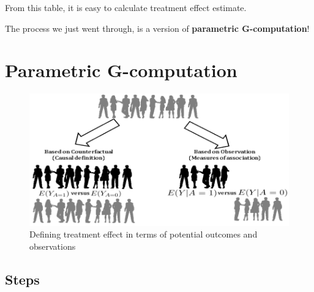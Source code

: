 \documentclass[
]{book}
\begin{document}
From this table, it is easy to calculate treatment effect estimate.

\begin{rmdcomment}
The process we just went through, is a version of \textbf{parametric
G-computation}!
\end{rmdcomment}

\hypertarget{parametric-g-computation}{%
\section{Parametric G-computation}\label{parametric-g-computation}}

\begin{figure}
\includegraphics[width=0.7\linewidth]{images/gcomp} \caption{Defining treatment effect in terms of potential outcomes and observations}\label{fig:gcomppic}
\end{figure}

\hypertarget{steps}{%
\subsection{Steps}\label{steps}}
\end{document}
